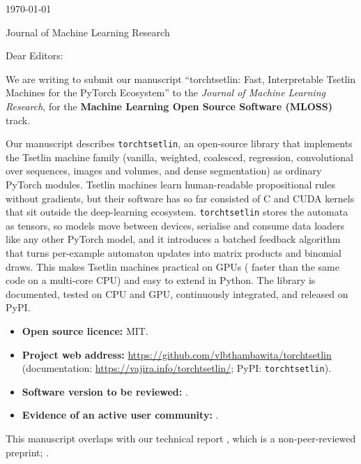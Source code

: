 


\hfill{\today}

Journal of Machine Learning Research

\bigskip

Dear Editors:

We are writing to submit our manuscript ``torchtsetlin: Fast, Interpretable Tsetlin Machines for the
PyTorch Ecosystem'' to the \emph{Journal of Machine Learning Research}, for the
\textbf{Machine Learning Open Source Software (MLOSS)} track.

Our manuscript describes \texttt{torchtsetlin}, an open-source library that implements the
Tsetlin machine family (vanilla, weighted, coalesced, regression, convolutional over sequences,
images and volumes, and dense segmentation) as ordinary PyTorch modules. Tsetlin machines learn
human-readable propositional rules without gradients, but their software has so far consisted
of C and CUDA kernels that sit outside the deep-learning ecosystem. \texttt{torchtsetlin} stores
the automata as tensors, so models move between devices, serialise and consume data loaders like
any other PyTorch model, and it introduces a batched feedback algorithm that turns per-example
automaton updates into matrix products and binomial draws. This makes Tsetlin machines
practical on GPUs ( faster than the same code on a multi-core CPU) and
easy to extend in Python. The library is documented, tested on CPU and GPU, continuously
integrated, and released on PyPI.

\begin{itemize}
  \item \textbf{Open source licence:} MIT.
  \item \textbf{Project web address:} \url{https://github.com/vlbthambawita/torchtsetlin}
        (documentation: \url{https://vajira.info/torchtsetlin/}; PyPI: \texttt{torchtsetlin}).
  \item \textbf{Software version to be reviewed:} .
  \item \textbf{Evidence of an active user community:} .
\end{itemize}

This manuscript overlaps with our technical report , which is a
non-peer-reviewed preprint; .

